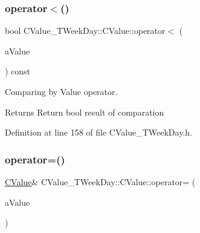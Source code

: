 \mbox{\label{class_c_value___t_week_day_1_1_c_value_a8cbf6de4d8c42c14ce05ed46aa6ecb20}} 
\subsubsection{\texorpdfstring{operator$<$()}{operator<()}}
{\footnotesize\ttfamily bool C\+Value\+\_\+\+T\+Week\+Day\+::\+C\+Value\+::operator$<$ (\begin{DoxyParamCaption}\item[{const \hyperlink{class_c_value___t_week_day_1_1_c_value}{C\+Value} \&}]{a\+Value }\end{DoxyParamCaption}) const\hspace{0.3cm}{\ttfamily [inline]}}



Comparing by Value operator. 

\begin{DoxyReturn}{Returns}
Return {\ttfamily bool} result of comparation 
\end{DoxyReturn}


Definition at line 158 of file C\+Value\+\_\+\+T\+Week\+Day.\+h.

\mbox{\label{class_c_value___t_week_day_1_1_c_value_a8b2de98efd431f204874ad7af5b6a712}} 
\subsubsection{\texorpdfstring{operator=()}{operator=()}}
{\footnotesize\ttfamily \hyperlink{class_c_value___t_week_day_1_1_c_value}{C\+Value}\& C\+Value\+\_\+\+T\+Week\+Day\+::\+C\+Value\+::operator= (\begin{DoxyParamCaption}\item[{const \hyperlink{class_c_value___t_week_day_1_1_c_value}{C\+Value} \&}]{a\+Value }\end{DoxyParamCaption})\hspace{0.3cm}{\ttfamily [inline]}}



